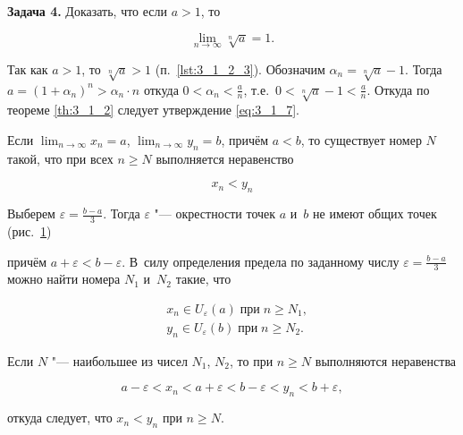 \textbf{Задача 4.}\label{ex:3_1_4} Доказать, что если $a > 1$, то

\begin{equation}\label{eq:3_1_7}
\displaystyle \lim_{n \to \infty} \sqrt[n]{a} = 1.
\end{equation}

Так как $a > 1$, то $\sqrt[n]{a} > 1$ (п.\ \ref{lst:3_1_2_3}).
Обозначим $\alpha_{n} = \sqrt[n]{a} - 1$.
Тогда $a = (1 + \alpha_{n})^{n} > \alpha_{n} \cdot n$ откуда
$\displaystyle 0 < \alpha_{n} < \frac{a}{n}$, т.е.\
$\displaystyle 0 < \sqrt[n]{a} - 1 < \frac{a}{n}$.
Откуда по теореме \ref{th:3_1_2} следует утверждение \eqref{eq:3_1_7}.

\begin{Th}\label{th:3_1_3}
Если
$\displaystyle \lim_{n \to \infty} x_{n} = a$,
$\displaystyle \lim_{n \to \infty} y_{n} = b$,
причём $a < b$, то существует номер $N$ такой, что при всех $n \geqslant N$
выполняется неравенство

\begin{equation}\label{eq:3_1_8}
x_{n} < y_{n}
\end{equation}
\end{Th}

Выберем $\displaystyle \varepsilon = \frac{b - a}{3}$.
Тогда $\varepsilon$ "--- окрестности точек $a$ и~$b$ не имеют общих точек
(рис.\ \ref{fig:3_1_5})

\begin{figure}\label{fig:3_1_5}
\end{figure}

\noindent
причём $a + \varepsilon < b - \varepsilon$.
В~силу определения предела по заданному числу $\displaystyle \varepsilon = \frac{b - a}{3}$
можно найти номера $N_{1}$ и~$N_{2}$ такие, что

\begin{align*}
& x_{n} \in U_{\varepsilon}(a) \; \text{при} \; n \geqslant N_{1}, \\
& y_{n} \in U_{\varepsilon}(b) \; \text{при} \; n \geqslant N_{2}.
\end{align*}

\noindent
Если $N$ "--- наибольшее из чисел $N_{1}$, $N_{2}$, то при $n \geqslant N$ выполняются
неравенства

\begin{equation*}
a - \varepsilon <
x_{n} < 
a + \varepsilon <
b - \varepsilon <
y_{n} < 
b + \varepsilon,
\end{equation*}

\noindent
откуда следует, что $x_{n} < y_{n}$ при $n \geqslant N$.

